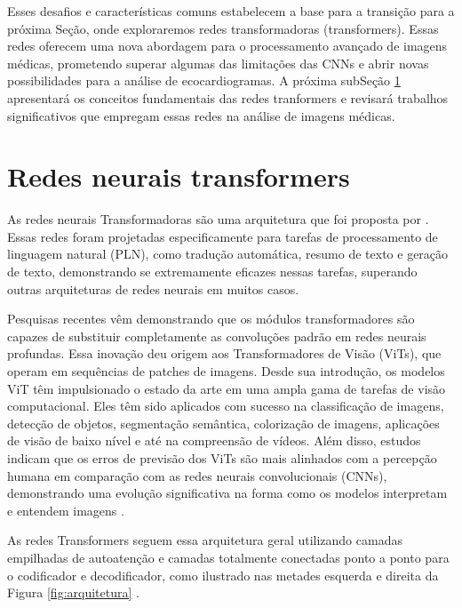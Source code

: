 Esses desafios e características comuns estabelecem a base para a transição para a próxima Seção, onde exploraremos redes transformadoras (transformers). Essas redes oferecem uma nova abordagem para o processamento avançado de imagens médicas, prometendo superar algumas das limitações das CNNs e abrir novas possibilidades para a análise de ecocardiogramas. A próxima subSeção \ref{subsec:Redes neurais transformers} apresentará os conceitos fundamentais das redes tranformers e revisará trabalhos significativos que empregam essas redes na análise de imagens médicas.


\section{Redes neurais transformers}
\label{subsec:Redes neurais transformers}

As redes neurais Transformadoras são uma arquitetura que foi proposta  por \textcite{https://doi.org/10.48550/arxiv.1706.03762}. Essas redes foram projetadas especificamente para tarefas de processamento de linguagem natural (PLN), como tradução automática, resumo de texto e geração de texto, demonstrando se extremamente eficazes nessas tarefas, superando outras arquiteturas de redes neurais em muitos casos.

Pesquisas recentes vêm demonstrando que os módulos transformadores são capazes de substituir completamente as convoluções padrão em redes neurais profundas. Essa inovação deu origem aos Transformadores de Visão (ViTs), que operam em sequências de patches de imagens. Desde sua introdução, os modelos ViT têm impulsionado o estado da arte em uma ampla gama de tarefas de visão computacional. Eles têm sido aplicados com sucesso na classificação de imagens, detecção de objetos, segmentação semântica, colorização de imagens, aplicações de visão de baixo nível e até na compreensão de vídeos. Além disso, estudos indicam que os erros de previsão dos ViTs são mais alinhados com a percepção humana em comparação com as redes neurais convolucionais (CNNs), demonstrando uma evolução significativa na forma como os modelos interpretam e entendem imagens \cite{SHAMSHAD2023102802}.

As redes Transformers seguem essa arquitetura geral utilizando camadas empilhadas de autoatenção e camadas totalmente conectadas ponto a ponto para o codificador e decodificador, como ilustrado nas metades esquerda e direita da Figura \ref{fig:arquitetura} \cite{https://doi.org/10.48550/arxiv.1706.03762}. 

